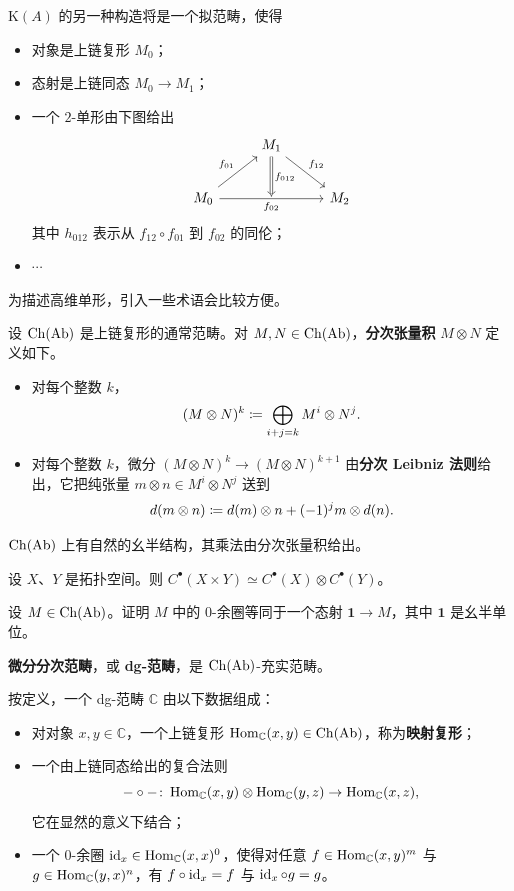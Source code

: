 \nitem\label{L17-2.2} $\mathrm{K}(A)$ 的另一种构造将是一个拟范畴，使得
\begin{itemize}[leftmargin=2.2em,itemsep=0.1em]
\item 对象是上链复形 $M_0$；
\item 态射是上链同态 $M_0\to M_1$；
\item 一个 $2$-单形由下图给出
\[
\begin{tikzcd}[row sep=2.2em,column sep=2.6em]
& M_1 \arrow[dr, "f_{12}"] \arrow[d, Rightarrow, "f_{012}"] & \\
M_0 \arrow[ur, "f_{01}"] \arrow[rr, "f_{02}"'] & {} & M_2
\end{tikzcd}
\]
其中 $h_{012}$ 表示从 $f_{12}\circ f_{01}$ 到 $f_{02}$ 的同伦；
\item $\cdots$
\end{itemize}
为描述高维单形，引入一些术语会比较方便。

\begin{construction}\label{L17-2.3}
设 $\operatorname{Ch}(\operatorname{Ab})$ 是上链复形的通常范畴。对 $M,N\in\operatorname{Ch}(\operatorname{Ab})$，\textbf{分次张量积} $M\otimes N$ 定义如下。
\begin{itemize}[leftmargin=2.2em,itemsep=0.1em]
\item 对每个整数 $k$，
\[
(M\otimes N)^k\coloneqq\bigoplus_{i+j=k}M^i\otimes N^j.
\]
\item 对每个整数 $k$，微分 $(M\otimes N)^k\to(M\otimes N)^{k+1}$ 由\textbf{分次 Leibniz 法则}给出，它把纯张量 $m\otimes n\in M^i\otimes N^j$ 送到
\[
d(m\otimes n)\coloneqq d(m)\otimes n+(-1)^j m\otimes d(n).
\]
\end{itemize}
$\operatorname{Ch}(\operatorname{Ab})$ 上有自然的幺半结构，其乘法由分次张量积给出。
\end{construction}

\begin{example}\label{L17-2.4}
设 $X$、$Y$ 是拓扑空间。则 $C^{\bullet}(X\times Y)\simeq C^{\bullet}(X)\otimes C^{\bullet}(Y)$。
\end{example}

\begin{exercise}\label{L17-2.5}
设 $M\in\operatorname{Ch}(\operatorname{Ab})$。证明 $M$ 中的 $0$-余圈等同于一个态射 $\mathbf{1}\to M$，其中 $\mathbf{1}$ 是幺半单位。
\end{exercise}

\begin{definition}\label{L17-2.6}
\textbf{微分分次范畴}，或 \textbf{dg-范畴}，是 $\operatorname{Ch}(\operatorname{Ab})$-充实范畴。
\end{definition}

\nitem\label{L17-2.7} 按定义，一个 dg-范畴 $\mathbb{C}$ 由以下数据组成：
\begin{itemize}[leftmargin=2.2em,itemsep=0.1em]
\item 对对象 $x,y\in\mathbb{C}$，一个上链复形 $\operatorname{Hom}_{\mathbb{C}}(x,y)\in\operatorname{Ch}(\operatorname{Ab})$，称为\textbf{映射复形}；
\item 一个由上链同态给出的复合法则
\[
-\circ-\colon\operatorname{Hom}_{\mathbb{C}}(x,y)\otimes\operatorname{Hom}_{\mathbb{C}}(y,z)\to\operatorname{Hom}_{\mathbb{C}}(x,z),
\]
它在显然的意义下结合；
\item 一个 $0$-余圈 $\operatorname{id}_x\in\operatorname{Hom}_{\mathbb{C}}(x,x)^0$，使得对任意 $f\in\operatorname{Hom}_{\mathbb{C}}(x,y)^m$ 与 $g\in\operatorname{Hom}_{\mathbb{C}}(y,x)^n$，有 $f\circ\operatorname{id}_x=f$ 与 $\operatorname{id}_x\circ g=g$。
\end{itemize}

